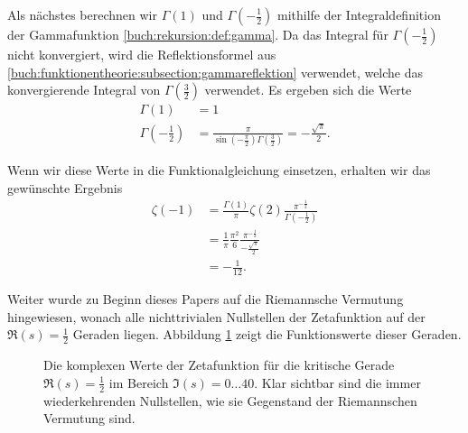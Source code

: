 Als nächstes berechnen wir $\Gamma(1)$ und $\Gamma\left(-\frac{1}{2}\right)$ mithilfe der Integraldefinition der Gammafunktion \ref{buch:rekursion:def:gamma}.
Da das Integral für $\Gamma\left(-\frac{1}{2}\right)$ nicht konvergiert, wird die Reflektionsformel aus \ref{buch:funktionentheorie:subsection:gammareflektion} verwendet, welche das konvergierende Integral von  $\Gamma\left(\frac{3}{2}\right)$ verwendet.
Es ergeben sich die Werte
\begin{align*}
    \Gamma(1)
    &= 1\\
    \Gamma\left(-\frac{1}{2}\right)
    &= \frac{\pi}{\sin\left(-\frac{\pi}{2}\right)
    \Gamma\left(\frac{3}{2}\right)}
    = -\frac{\sqrt{\pi}}{2}.
\end{align*}

Wenn wir diese Werte in die Funktionalgleichung einsetzen, erhalten wir das gewünschte Ergebnis
\begin{align*}
    \zeta(-1)
    &=
    \frac{\Gamma(1)}{\pi}
    \zeta(2)
    \frac{\pi^{-\frac{1}{2}}}{\Gamma \left( -\frac{1}{2} \right)}
    \\
    &=
    \frac{1}{\pi}
    \frac{\pi^2}{6}
    \frac{\pi^{-\frac{1}{2}}}{
    -\frac{\sqrt{\pi}}{2}}
    \\
    &=
    -\frac{1}{12}.
\end{align*}

Weiter wurde zu Beginn dieses Papers auf die Riemannsche Vermutung hingewiesen, wonach alle nichttrivialen Nullstellen der Zetafunktion auf der $\Re(s)=\frac{1}{2}$ Geraden liegen.
Abbildung \ref{zeta:fig:einzweitel} zeigt die Funktionswerte dieser Geraden.
\begin{figure}
    \centering
    
    \caption{Die komplexen Werte der Zetafunktion für die kritische Gerade $\Re(s)=\frac{1}{2}$ im Bereich $\Im(s) = 0\dots40$.
    Klar sichtbar sind die immer wiederkehrenden Nullstellen, wie sie Gegenstand der Riemannschen Vermutung sind.}
    \label{zeta:fig:einzweitel}
\end{figure}

